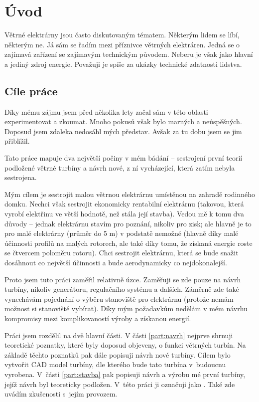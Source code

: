 \chapter{Úvod}

	Větrné elektrárny jsou často diskutovaným tématem. Některým lidem se líbí, některým ne. Já sám se řadím mezi příznivce větrných elektráren. Jedná se o zajímavá zařízení se zajímavým technickým původem. Neberu je však jako hlavní a jediný zdroj energie. Považuji je spíše za ukázky technické zdatnosti lidstva.
	
	\section{Cíle práce}
		Díky mému zájmu jsem před několika lety začal sám v této oblasti experimentovat a zkoumat. Mnoho pokusů však bylo marných a neúspěšných. Doposud jsem zdaleka nedosáhl mých představ. Avšak za tu dobu jsem se jim přiblížil.
		
		Tato práce mapuje dva největší počiny v mém bádání – sestrojení první teorií podložené větrné turbíny a návrh nové, z ní vycházející, která zatím nebyla sestrojena.
		
		Mým cílem je sestrojit malou větrnou elektrárnu umístěnou na zahradě rodinného domku. Nechci však sestrojit ekonomicky rentabilní elektrárnu (takovou, která vyrobí elektřinu ve větší hodnotě, než stála její stavba). Vedou mě k tomu dva důvody – jednak elektrárnu stavím pro poznání, nikoliv pro zisk; ale hlavně je to pro malé elektrárny (průměr do 5 m) v podstatě nemožné (hlavně díky malé účinnosti profilů na malých rotorech, ale také díky tomu, že získaná energie roste se čtvercem poloměru rotoru). Chci sestrojit elektrárnu, která se bude snažit dosáhnout co největší účinnosti a bude aerodynamicky co nejdokonalejší.
		
		Proto jsem tuto práci zaměřil relativně úzce. Zaměřuji se zde pouze na návrh turbíny, nikoliv generátoru, regulačního systému a dalších. Záměrně zde také vynechávám pojednání o výběru stanoviště pro elektrárnu (protože nemám možnost si stanoviště vybírat). Díky mým požadavkům nedělám v mém návrhu kompromisy mezi komplikovaností výroby a získanou energií.
		
		Práci jsem rozdělil na dvě hlavní části. V části \ref{part:navrh} nejprve shrnuji teoretické poznatky, které byly doposud objeveny, o funkci větrných turbín. Na základě těchto poznatků pak dále popisuji návrh nové turbíny. Cílem bylo vytvořit CAD model turbíny, dle kterého bude tato turbína v~budoucnu vyrobena.
		V~části \ref{part:stavba} pak popisuji návrh a výrobu mé první turbíny, jejíž návrh byl teoreticky podložen. V~této práci ji označuji jako . Také zde uvádím zkušenosti s~jejím provozem.
	
